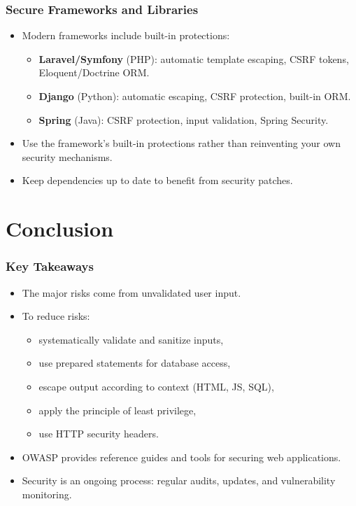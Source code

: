 \documentclass{beamer}
\begin{document}
\begin{frame}
\frametitle{Secure Frameworks and Libraries}

\begin{itemize}
\item Modern frameworks include built-in protections:
\begin{itemize}
\item \textbf{Laravel/Symfony} (PHP): automatic template escaping, CSRF tokens, Eloquent/Doctrine ORM.
\item \textbf{Django} (Python): automatic escaping, CSRF protection, built-in ORM.
\item \textbf{Spring} (Java): CSRF protection, input validation, Spring Security.
\end{itemize}
\item \alert{Use the framework's built-in protections} rather than reinventing your own security mechanisms.
\item Keep dependencies \alert{up to date} to benefit from security patches.
\end{itemize}
\end{frame}


\section{Conclusion}

\begin{frame}
\frametitle{Key Takeaways}

\begin{itemize}
\item The major risks come from \alert{unvalidated user input}.
\item To reduce risks:
\begin{itemize}
\item systematically validate and sanitize inputs,
\item use prepared statements for database access,
\item escape output according to context (HTML, JS, SQL),
\item apply the principle of least privilege,
\item use HTTP security headers.
\end{itemize}
\item OWASP provides reference guides and tools for securing web applications.
\item Security is an \alert{ongoing process}: regular audits, updates, and vulnerability monitoring.
\end{itemize}
\end{frame}
\end{document}
